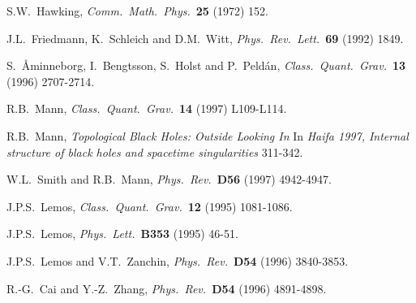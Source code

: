 \documentclass[12pt,a4paper]{article}
\begin{document}
\begin{thebibliography}{99}

 S.W.~Hawking,
                   {\it Comm.~Math.~Phys.}~{\bf 25} (1972) 152.

 J.L.~Friedmann, K.~Schleich and D.M.~Witt,
                  {\it Phys.~Rev.~Lett.}~{\bf 69} (1992) 1849.

 S.~\AA minneborg, I.~Bengtsson, S.~Holst 
                   and  P.~Peld\'an,
                   {\it Class.~Quant.~Grav.}~{\bf 13} (1996) 2707-2714.

 R.B.~Mann, 
                   {\it Class.~Quant.~Grav.}~{\bf 14} (1997) L109-L114.

 R.B.~Mann, 
                  {\sl Topological Black Holes: Outside Looking In}
                  In {\sl Haifa 1997, Internal structure of black holes 
                  and spacetime singularities} 311-342. 

 W.L.~Smith and R.B.~Mann,
                 {\it Phys.~Rev.}~{\bf D56} (1997) 4942-4947.

 J.P.S.~Lemos,
                  {\it  Class.~Quant.~Grav.}~{\bf 12} (1995) 1081-1086.

 J.P.S.~Lemos,
                  {\it Phys.~Lett.}~{\bf B353} (1995) 46-51. 

 J.P.S.~Lemos and V.T.~Zanchin,
                   {\it Phys.~Rev.}~{\bf D54} (1996) 3840-3853.

 R.-G.~Cai and  Y.-Z.~Zhang,
                   {\it Phys.~Rev.}~{\bf D54} (1996) 4891-4898.


\end{thebibliography}
\end{document}
